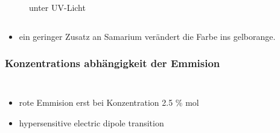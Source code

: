 \documentclass{beamer}
\begin{document}
\begin{frame}[t]
\begin{columns}
\begin{figure}[!h]
      \caption*{\footnotesize {} unter UV-Licht}
 \end{figure}
      \end{columns}

 \begin{itemize}
      \item \footnotesize ein geringer Zusatz an Samarium verändert die Farbe ins gelborange.
    \end{itemize}   

\end{frame}


\begin{frame}[t]\frametitle{Konzentrations abhängigkeit der Emmision}
 \begin{columns}
    \begin{itemize}
      \item \footnotesize rote Emmision  erst bei Konzentration 2.5 \% \si{\mol} 
      \item  \footnotesize hypersensitive electric dipole transition  
    \end{itemize}
      \begin{figure}[!h]
\centering

      \caption*{\tiny {}}
 \end{figure}
 \end{columns}

\end{frame}
\end{document}
